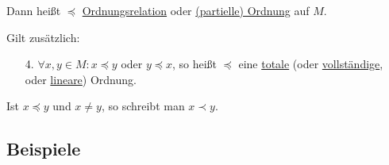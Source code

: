 \documentclass[a4paper, 12pt, twoside] {article}
\begin{document}
Dann heißt $\preceq$ \underline{Ordnungsrelation} oder \underline{(partielle) Ordnung} auf $M$.

Gilt zusätzlich:

\begin{enumerate}

\item[4.] $\forall x, y \in M: x \preceq y$ oder $y \preceq x$,
so heißt $\preceq$ eine \underline{totale} (oder \underline{vollständige}, oder \underline{lineare}) Ordnung.
\end{enumerate}


Ist $x \preceq y$ und $x \neq y$, so schreibt man $x \prec y$.

\subsection{Beispiele}
\end{document}
